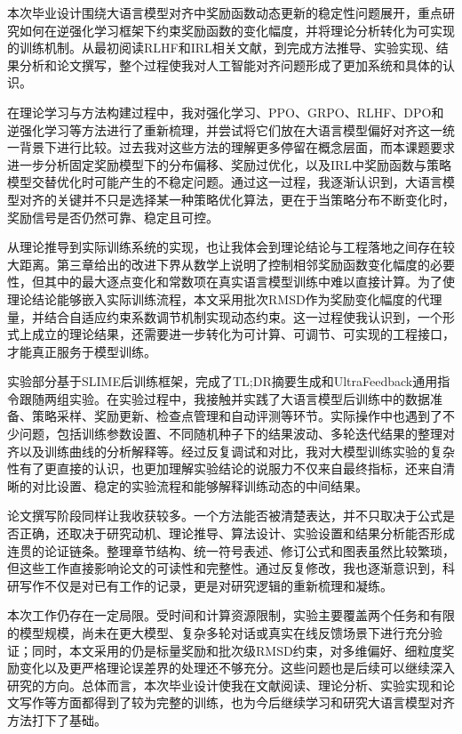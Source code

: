 
\begin{designsummary}
本次毕业设计围绕大语言模型对齐中奖励函数动态更新的稳定性问题展开，重点研究如何在逆强化学习框架下约束奖励函数的变化幅度，并将理论分析转化为可实现的训练机制。从最初阅读RLHF和IRL相关文献，到完成方法推导、实验实现、结果分析和论文撰写，整个过程使我对人工智能对齐问题形成了更加系统和具体的认识。

在理论学习与方法构建过程中，我对强化学习、PPO、GRPO、RLHF、DPO和逆强化学习等方法进行了重新梳理，并尝试将它们放在大语言模型偏好对齐这一统一背景下进行比较。过去我对这些方法的理解更多停留在概念层面，而本课题要求进一步分析固定奖励模型下的分布偏移、奖励过优化，以及IRL中奖励函数与策略模型交替优化时可能产生的不稳定问题。通过这一过程，我逐渐认识到，大语言模型对齐的关键并不只是选择某一种策略优化算法，更在于当策略分布不断变化时，奖励信号是否仍然可靠、稳定且可控。

从理论推导到实际训练系统的实现，也让我体会到理论结论与工程落地之间存在较大距离。第三章给出的改进下界从数学上说明了控制相邻奖励函数变化幅度的必要性，但其中的最大逐点变化和常数项在真实语言模型训练中难以直接计算。为了使理论结论能够嵌入实际训练流程，本文采用批次RMSD作为奖励变化幅度的代理量，并结合自适应约束系数调节机制实现动态约束。这一过程使我认识到，一个形式上成立的理论结果，还需要进一步转化为可计算、可调节、可实现的工程接口，才能真正服务于模型训练。

实验部分基于SLIME后训练框架，完成了TL;DR摘要生成和UltraFeedback通用指令跟随两组实验。在实验过程中，我接触并实践了大语言模型后训练中的数据准备、策略采样、奖励更新、检查点管理和自动评测等环节。实际操作中也遇到了不少问题，包括训练参数设置、不同随机种子下的结果波动、多轮迭代结果的整理对齐以及训练曲线的分析解释等。经过反复调试和对比，我对大模型训练实验的复杂性有了更直接的认识，也更加理解实验结论的说服力不仅来自最终指标，还来自清晰的对比设置、稳定的实验流程和能够解释训练动态的中间结果。

论文撰写阶段同样让我收获较多。一个方法能否被清楚表达，并不只取决于公式是否正确，还取决于研究动机、理论推导、算法设计、实验设置和结果分析能否形成连贯的论证链条。整理章节结构、统一符号表述、修订公式和图表虽然比较繁琐，但这些工作直接影响论文的可读性和完整性。通过反复修改，我也逐渐意识到，科研写作不仅是对已有工作的记录，更是对研究逻辑的重新梳理和凝练。

本次工作仍存在一定局限。受时间和计算资源限制，实验主要覆盖两个任务和有限的模型规模，尚未在更大模型、复杂多轮对话或真实在线反馈场景下进行充分验证；同时，本文采用的仍是标量奖励和批次级RMSD约束，对多维偏好、细粒度奖励变化以及更严格理论误差界的处理还不够充分。这些问题也是后续可以继续深入研究的方向。总体而言，本次毕业设计使我在文献阅读、理论分析、实验实现和论文写作等方面都得到了较为完整的训练，也为今后继续学习和研究大语言模型对齐方法打下了基础。
\end{designsummary}
